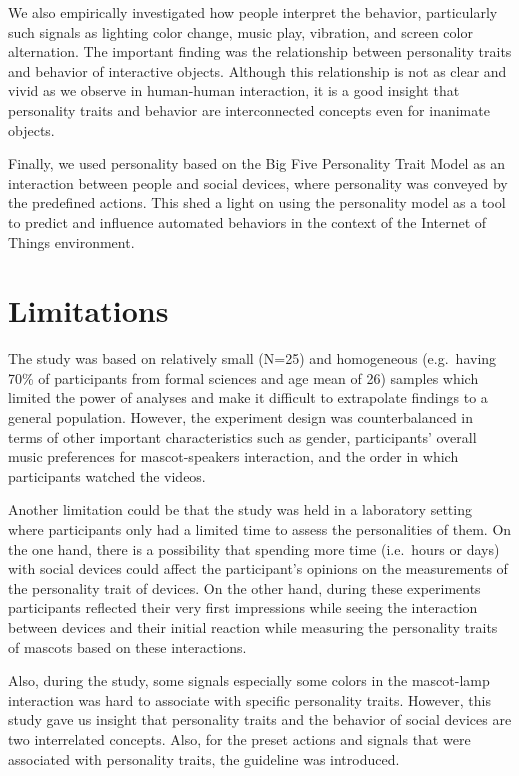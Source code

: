 We also empirically investigated how people interpret the behavior, particularly such
signals as lighting color change, music play, vibration, and screen color alternation.
The important finding was the relationship between personality traits and behavior of interactive objects.
Although this relationship is not as clear and vivid as we observe in human-human interaction,
it is a good insight that personality traits and behavior are interconnected concepts even for inanimate objects.

Finally, we used personality based on the Big Five Personality Trait Model as an interaction
between people and social devices, where personality was conveyed by the predefined actions.
This shed a light on using the personality model as a tool to predict and influence automated behaviors
in the context of the Internet of Things environment.

\section{Limitations}
\label{sec:limitations}
The study was based on relatively small (N=25) and homogeneous
(e.g.\ having 70\% of participants from formal sciences and age mean of 26) samples which
limited the power of analyses and make it difficult to extrapolate findings to a general population.
However, the experiment design was counterbalanced in terms of other important
characteristics such as gender, participants’ overall music preferences for mascot-speakers
interaction, and the order in which participants watched the videos.

Another limitation could be that the study was held in a laboratory setting where
participants only had a limited time to assess the personalities of them.
On the one hand, there is a possibility that spending more time (i.e.\ hours or days)
with social devices could affect the participant’s opinions on the measurements of the personality trait of devices.
On the other hand, during these experiments participants reflected their very first impressions
while seeing the interaction between devices and their initial reaction while measuring the
personality traits of mascots based on these interactions.

Also, during the study, some signals especially some colors in the mascot-lamp interaction was
hard to associate with specific personality traits.
However, this study gave us insight that personality traits and the behavior
of social devices are two interrelated concepts.
Also, for the preset actions and signals that were associated with personality traits,
the guideline was introduced.

